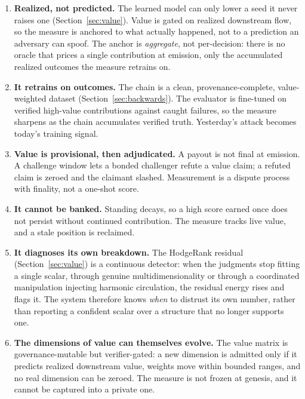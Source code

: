 \documentclass[10pt]{article}
\begin{document}
\begin{enumerate}[leftmargin=1.4em,itemsep=2pt]
\item \textbf{Realized, not predicted.} The learned model can only lower a seed it never raises one
(Section~\ref{sec:value}). Value is gated on realized downstream flow, so the measure is anchored to
what actually happened, not to a prediction an adversary can spoof. The anchor is \emph{aggregate}, not
per-decision: there is no oracle that prices a single contribution at emission, only the accumulated
realized outcomes the measure retrains on.
\item \textbf{It retrains on outcomes.} The chain is a clean, provenance-complete, value-weighted
dataset (Section~\ref{sec:backwards}). The evaluator is fine-tuned on verified high-value contributions
against caught failures, so the measure sharpens as the chain accumulates verified truth. Yesterday's
attack becomes today's training signal.
\item \textbf{Value is provisional, then adjudicated.} A payout is not final at emission. A challenge
window lets a bonded challenger refute a value claim; a refuted claim is zeroed and the claimant
slashed. Measurement is a dispute process with finality, not a one-shot score.
\item \textbf{It cannot be banked.} Standing decays, so a high score earned once does not persist
without continued contribution. The measure tracks live value, and a stale position is reclaimed.
\item \textbf{It diagnoses its own breakdown.} The HodgeRank residual (Section~\ref{sec:value}) is a
continuous detector: when the judgments stop fitting a single scalar, through genuine
multidimensionality or through a coordinated manipulation injecting harmonic circulation, the residual
energy rises and flags it. The system therefore knows \emph{when} to distrust its own number, rather
than reporting a confident scalar over a structure that no longer supports one.
\item \textbf{The dimensions of value can themselves evolve.} The value matrix is governance-mutable but
verifier-gated: a new dimension is admitted only if it predicts realized downstream value, weights move
within bounded ranges, and no real dimension can be zeroed. The measure is not frozen at genesis, and it
cannot be captured into a private one.
\end{enumerate}
\end{document}
